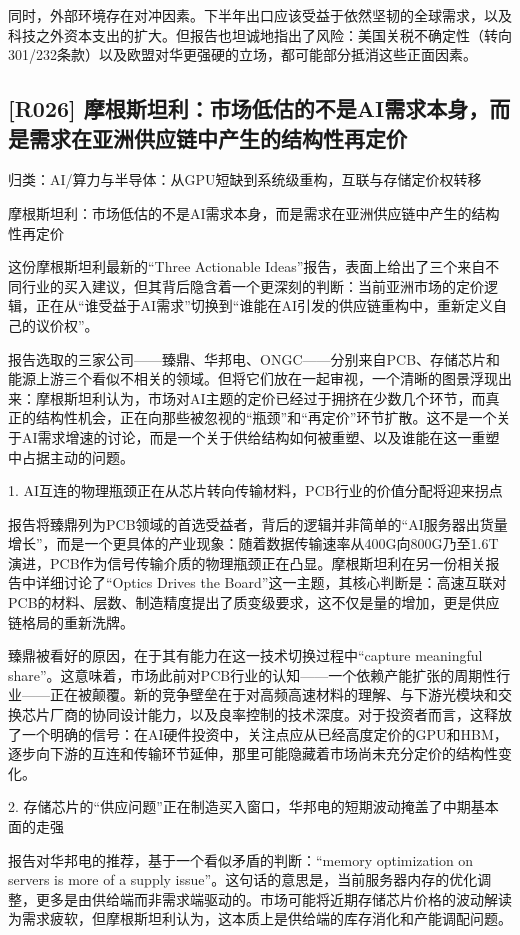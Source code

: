 \documentclass[11pt]{ctexart}
\begin{document}
同时，外部环境存在对冲因素。下半年出口应该受益于依然坚韧的全球需求，以及科技之外资本支出的扩大。但报告也坦诚地指出了风险：美国关税不确定性（转向301/232条款）以及欧盟对华更强硬的立场，都可能部分抵消这些正面因素。

\subsection{[R026] 摩根斯坦利：市场低估的不是AI需求本身，而是需求在亚洲供应链中产生的结构性再定价}
{\small\color{refgray}归类：AI/算力与半导体：从GPU短缺到系统级重构，互联与存储定价权转移}

摩根斯坦利：市场低估的不是AI需求本身，而是需求在亚洲供应链中产生的结构性再定价

这份摩根斯坦利最新的“Three Actionable Ideas”报告，表面上给出了三个来自不同行业的买入建议，但其背后隐含着一个更深刻的判断：当前亚洲市场的定价逻辑，正在从“谁受益于AI需求”切换到“谁能在AI引发的供应链重构中，重新定义自己的议价权”。

报告选取的三家公司——臻鼎、华邦电、ONGC——分别来自PCB、存储芯片和能源上游三个看似不相关的领域。但将它们放在一起审视，一个清晰的图景浮现出来：摩根斯坦利认为，市场对AI主题的定价已经过于拥挤在少数几个环节，而真正的结构性机会，正在向那些被忽视的“瓶颈”和“再定价”环节扩散。这不是一个关于AI需求增速的讨论，而是一个关于供给结构如何被重塑、以及谁能在这一重塑中占据主动的问题。

1. AI互连的物理瓶颈正在从芯片转向传输材料，PCB行业的价值分配将迎来拐点

报告将臻鼎列为PCB领域的首选受益者，背后的逻辑并非简单的“AI服务器出货量增长”，而是一个更具体的产业现象：随着数据传输速率从400G向800G乃至1.6T演进，PCB作为信号传输介质的物理瓶颈正在凸显。摩根斯坦利在另一份相关报告中详细讨论了“Optics Drives the Board”这一主题，其核心判断是：高速互联对PCB的材料、层数、制造精度提出了质变级要求，这不仅是量的增加，更是供应链格局的重新洗牌。

臻鼎被看好的原因，在于其有能力在这一技术切换过程中“capture meaningful share”。这意味着，市场此前对PCB行业的认知——一个依赖产能扩张的周期性行业——正在被颠覆。新的竞争壁垒在于对高频高速材料的理解、与下游光模块和交换芯片厂商的协同设计能力，以及良率控制的技术深度。对于投资者而言，这释放了一个明确的信号：在AI硬件投资中，关注点应从已经高度定价的GPU和HBM，逐步向下游的互连和传输环节延伸，那里可能隐藏着市场尚未充分定价的结构性变化。

2. 存储芯片的“供应问题”正在制造买入窗口，华邦电的短期波动掩盖了中期基本面的走强

报告对华邦电的推荐，基于一个看似矛盾的判断：“memory optimization on servers is more of a supply issue”。这句话的意思是，当前服务器内存的优化调整，更多是由供给端而非需求端驱动的。市场可能将近期存储芯片价格的波动解读为需求疲软，但摩根斯坦利认为，这本质上是供给端的库存消化和产能调配问题。
\end{document}
